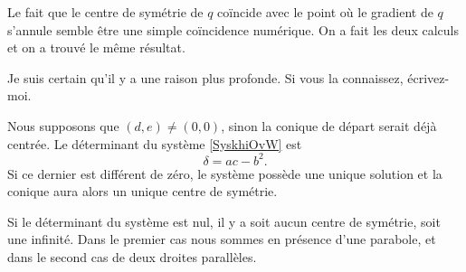 \begin{normaltext}
	Le fait que le centre de symétrie de \( q\) coïncide avec le point où le gradient de \( q\) s'annule semble être une simple coïncidence numérique. On a fait les deux calculs et on a trouvé le même résultat.

	Je suis certain qu'il y a une raison plus profonde. Si vous la connaissez, écrivez-moi.
\end{normaltext}


Nous supposons que \( (d,e)\neq (0,0)\), sinon la conique de départ serait déjà centrée. Le déterminant du système \eqref{SyskhiOvW} est
\begin{equation}
	\delta=ac-b^2.
\end{equation}
Si ce dernier est différent de zéro, le système possède une unique solution et la conique aura alors un unique centre de symétrie.

Si le déterminant du système est nul, il y a soit aucun centre de symétrie, soit une infinité. Dans le premier cas nous sommes en présence d'une parabole, et dans le second cas de deux droites parallèles.

